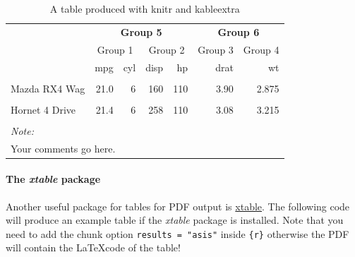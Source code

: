 \documentclass[
11pt,
a4paper]{article}
\begin{document}
\begin{table}

\caption{\label{tab:kable_tab}A table produced with knitr and kableextra}
\centering
\fontsize{9}{11}\selectfont
\begin{tabular}[t]{lrrrrrr}
\toprule
\multicolumn{1}{c}{\textbf{ }} & \multicolumn{4}{c}{\textbf{Group 5}} & \multicolumn{2}{c}{\textbf{Group 6}} \\
\cmidrule(l{3pt}r{3pt}){2-5} \cmidrule(l{3pt}r{3pt}){6-7}
\multicolumn{1}{c}{ } & \multicolumn{2}{c}{Group 1} & \multicolumn{2}{c}{Group 2} & \multicolumn{1}{c}{Group 3} & \multicolumn{1}{c}{Group 4} \\
\cmidrule(l{3pt}r{3pt}){2-3} \cmidrule(l{3pt}r{3pt}){4-5} \cmidrule(l{3pt}r{3pt}){6-6} \cmidrule(l{3pt}r{3pt}){7-7}
  & mpg & cyl & disp & hp & drat & wt\\
\midrule
\cellcolor{gray!6}{Mazda RX4} & \cellcolor{gray!6}{21.0} & \cellcolor{gray!6}{6} & \cellcolor{gray!6}{160} & \cellcolor{gray!6}{110} & \cellcolor{gray!6}{3.90} & \cellcolor{gray!6}{2.620}\\
Mazda RX4 Wag & 21.0 & 6 & 160 & 110 & 3.90 & 2.875\\
\cellcolor{gray!6}{Datsun 710} & \cellcolor{gray!6}{22.8} & \cellcolor{gray!6}{4} & \cellcolor{gray!6}{108} & \cellcolor{gray!6}{93} & \cellcolor{gray!6}{3.85} & \cellcolor{gray!6}{2.320}\\
Hornet 4 Drive & 21.4 & 6 & 258 & 110 & 3.08 & 3.215\\
\cellcolor{gray!6}{Hornet Sportabout} & \cellcolor{gray!6}{18.7} & \cellcolor{gray!6}{8} & \cellcolor{gray!6}{360} & \cellcolor{gray!6}{175} & \cellcolor{gray!6}{3.15} & \cellcolor{gray!6}{3.440}\\
\bottomrule
\multicolumn{7}{l}{\rule{0pt}{1em}\textit{Note: }}\\
\multicolumn{7}{l}{\rule{0pt}{1em}Your comments go here.}\\
\end{tabular}
\end{table}

\hypertarget{the-xtable-package}{%
\paragraph{\texorpdfstring{The \emph{xtable}
package}{The xtable package}}\label{the-xtable-package}}

Another useful package for tables for PDF output is
\href{https://cran.r-project.org/web/packages/xtable/vignettes/xtableGallery.pdf}{xtable}.
The following code will produce an example table if the \emph{xtable}
package is installed. Note that you need to add the chunk option
\texttt{results\ =\ "asis"} inside \texttt{\{r\}} otherwise the PDF will
contain the \LaTeX code of the table!
\end{document}
